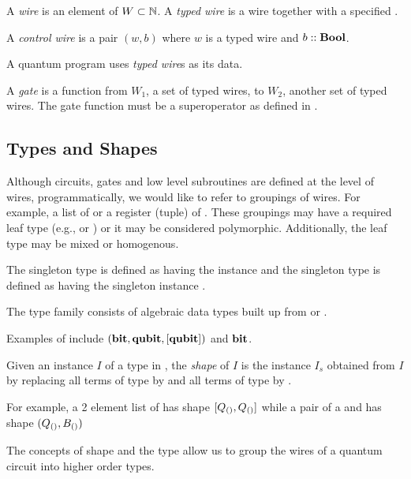 \begin{definition}\label{def:wire}
  A \emph{wire} is an element of $W\subset\mathbb{N}$. A \emph{typed wire} is a wire
  together with a specified .
\end{definition}

\begin{definition}\label{def:control}
  A \emph{control wire} is a pair $(w,b)$ where $w$ is a
  typed wire and $b::\mathbf{{Bool}}$.
\end{definition}

A quantum program uses \emph{typed wire}s as its data.

\begin{definition}\label{def:gate}
  A \emph{gate} is a function from $W_1$, a set of typed wires, to $W_2$,
  another
  set of typed wires. The gate function must be a superoperator
  as defined in \cite{selinger04:qpl}.
\end{definition}

\subsection{Types and Shapes} %
\label{sub:types_and_shapes}
Although circuits, gates and low level subroutines are defined at
the level of wires, programmatically, we would like
to refer to groupings of wires. For example, a list of \qubit
or a register (tuple) of \qubit. These groupings may have a
required leaf type (e.g., \qubit or \bit) or it may be
considered polymorphic. Additionally, the leaf type may be mixed
or homogenous.


\begin{definition}\label{def:singletons}
  The singleton type  is defined as having the instance \Bs and the
  singleton type  is defined as having the singleton instance \Qs.
\end{definition}

\begin{definition}\label{def:qcdata}
  The type family  consists of algebraic data types
  built up from \bit or \qubit.
\end{definition}

Examples of  include $(\mathbf{{bit}},\mathbf{{qubit}},[\mathbf{{qubit}}])$ and $\mathbf{{bit}}$.

\begin{definition}\label{def:shape}
  Given an instance $I$ of a type  in ,
  the \emph{shape} of $I$ is the instance $I_s$ obtained from
  $I$ by replacing all terms of type \bit by  \Bs and all terms
  of type \qubit by \Qs.
\end{definition}

For example, a 2 element list of \qubits has shape $[Q_{()},Q_{()}]$
while a pair of a \qubit and \bit has shape $(Q_{()},B_{()})$


The concepts of shape and the type  allow us to group
the wires of a quantum circuit into higher
order types.


